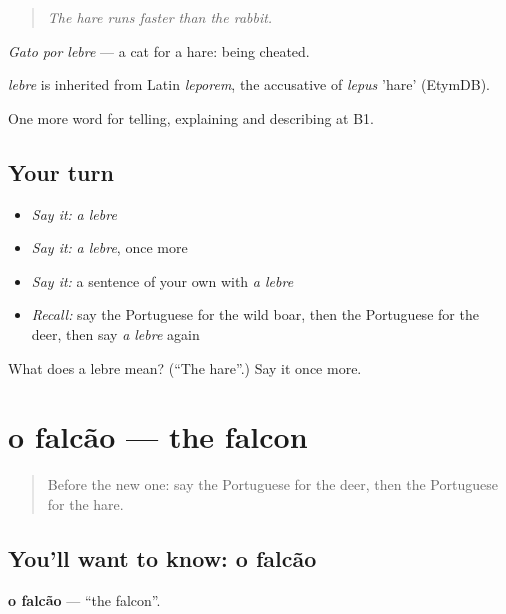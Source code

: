 \begin{quote}
\emph{The hare runs faster than the rabbit.}
\end{quote}

\emph{Gato por lebre} — a cat for a hare: being cheated.

\begin{cousinweb}
\emph{lebre} is inherited from Latin \emph{leporem}, the accusative of \emph{lepus} 'hare' (EtymDB).
\end{cousinweb}

\begin{grammarlens}[title={What you've built}]
One more word for telling, explaining and describing at B1.
\end{grammarlens}

\subsection*{Your turn}
\begin{itemize}
\raggedright
  \item \emph{Say it:} \emph{a lebre}
  \item \emph{Say it:} \emph{a lebre}, once more
  \item \emph{Say it:} a sentence of your own with \emph{a lebre}
  \item \emph{Recall:} say the Portuguese for the wild boar, then the Portuguese for the deer, then say \emph{a lebre} again
\end{itemize}

\begin{tcolorbox}[breakable,colback=teal!4,colframe=teal!35!black,title={Before you move on}]
What does a lebre mean? (\textquotedblleft{}The hare\textquotedblright{}.) Say it once more.
\end{tcolorbox}
\section[o falcão]{o falcão — the falcon}

\label{lesson:PT-C460-falcao}



\begin{quote}
Before the new one: say the Portuguese for the deer, then the Portuguese for the hare.
\end{quote}

\subsection*{You'll want to know: o falcão}
\textbf{o falcão} — \textquotedblleft{}the falcon\textquotedblright{}.

